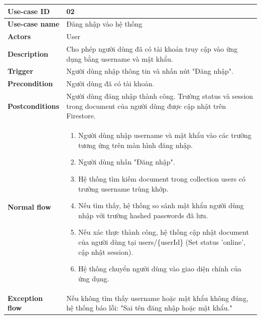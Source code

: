 \documentclass[a4paper, 12pt]{article}
\begin{document}
	\vspace{0.5cm}
	
	\begin{longtable}{|p{3.5cm}|p{12cm}|}
		\hline
		\textbf{Use-case ID} & 02 \\
		\hline
		\textbf{Use-case name} & Đăng nhập vào hệ thống \\
		\hline
		\textbf{Actors} & User \\
		\hline
		\textbf{Description} & Cho phép người dùng đã có tài khoản truy cập vào ứng dụng bằng username và mật khẩu. \\
		\hline
		\textbf{Trigger} & Người dùng nhập thông tin và nhấn nút "Đăng nhập". \\
		\hline
		\textbf{Precondition} &  Người dùng đã có tài khoản.\\

		\hline
		\textbf{Postconditions} & Người dùng đăng nhập thành công. Trường status và session trong document của người dùng được cập nhật trên Firestore. \\
		\hline
		\textbf{Normal flow} & 
		\begin{enumerate}
			\item Người dùng nhập username và mật khẩu vào các trường tương ứng trên màn hình đăng nhập.
			\item Người dùng nhấn "Đăng nhập".
			\item Hệ thống tìm kiếm document trong collection users có trường username trùng khớp.
			\item Nếu tìm thấy, hệ thống so sánh mật khẩu người dùng nhập với trường hashed passwords đã lưu.
			\item Nếu xác thực thành công, hệ thống cập nhật document của người dùng tại users/\{userId\} (Set status 'online', cập nhật session).
			\item Hệ thống chuyển người dùng vào giao diện chính của ứng dụng.
		\end{enumerate} \\
		\hline
		\textbf{Exception flow} &  Nếu không tìm thấy username hoặc mật khẩu không đúng, hệ thống báo lỗi: "Sai tên đăng nhập hoặc mật khẩu."\\
		\hline
	\end{longtable}
	\vspace{0.5cm}
	
\end{document}
